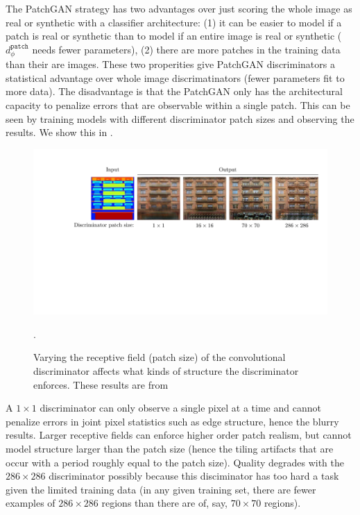 The PatchGAN strategy has two advantages over just scoring the whole image as real or synthetic with a classifier architecture: (1) it can be easier to model if a patch is real or synthetic than to model if an entire image is real or synthetic ($d_{\phi}^{\texttt{patch}}$ needs fewer parameters), (2) there are more patches in the training data than their are images. These two properities give PatchGAN discriminators a statistical advantage over whole image discrimatinators (fewer parameters fit to more data). The disadvantage is that the PatchGAN only has the architectural capacity to penalize errors that are observable within a single patch. This can be seen by training models with different discriminator patch sizes and observing the results. We show this in \fig{\ref{fig:conditional_generative_models:patchgan_patch_size_variations}}. %
\begin{figure}[h!]
    \centerline{
    \includegraphics[width=1.0\linewidth]{./figures/conditional_generative_models/patchgan_patch_size_variations.pdf}
    }
    \caption{Varying the receptive field (patch size) of the convolutional discriminator affects what kinds of structure the discriminator enforces. These results are from \cite{pix2pix2017}}.
    \label{fig:conditional_generative_models:patchgan_patch_size_variations}
\end{figure}

A $1\times1$ discriminator can only observe a single pixel at a time and cannot penalize errors in joint pixel statistics such as edge structure, hence the blurry results. Larger receptive fields can enforce higher order patch realism, but cannot model structure larger than the patch size (hence the tiling artifacts that are occur with a period roughly equal to the patch size). Quality degrades with the $286\times286$ discriminator possibly because this disciminator has too hard a task given the limited training data (in any given training set, there are fewer examples of $286\times286$ regions than there are of, say, $70\times70$ regions).

